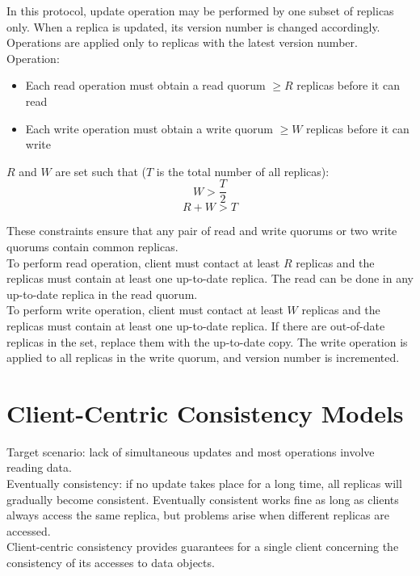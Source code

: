 \begin{multicols*}{2}
\noindent In this protocol, update operation may be performed by one subset of replicas only. When a replica is updated, its version number is changed accordingly. Operations are applied only to replicas with the latest version number.\\

\noindent Operation:
\begin{itemize}
  \item Each read operation must obtain a read quorum $\ge R$ replicas before it can read
  \item Each write operation must obtain a write quorum $\ge W$ replicas before it can write
\end{itemize}

\noindent $R$ and $W$ are set such that ($T$ is the total number of all replicas):
$$W > \frac{T}{2}$$
$$R+W > T$$

\noindent These constraints ensure that any pair of read and write quorums or two write quorums contain common replicas.\\

\noindent To perform read operation, client must contact at least $R$ replicas and the replicas must contain at least one up-to-date replica. The read can be done in any up-to-date replica in the read quorum. \\

\noindent To perform write operation, client must contact at least $W$ replicas and the replicas must contain at least one up-to-date replica. If there are out-of-date replicas in the set, replace them with the up-to-date copy. The write operation is applied to all replicas in the write quorum, and version number is incremented.

\section{Client-Centric Consistency Models}

\noindent Target scenario: lack of simultaneous updates and most operations involve reading data.\\

\noindent Eventually consistency: if no update takes place for a long time, all replicas will gradually become consistent. Eventually consistent works fine as long as clients always access the same replica, but problems arise when different replicas are accessed. \\

\noindent Client-centric consistency provides guarantees for a single client concerning the consistency of its accesses to data objects.


\end{multicols*}
